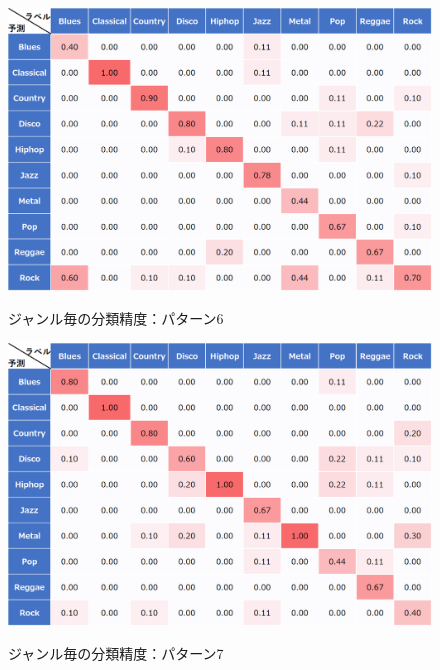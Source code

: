 \begin{figure}[htbp]
	\begin{center}
		\includegraphics[scale=0.5]{./images/classify-model/mel6_matrix.png}
		\caption{ジャンル毎の分類精度：パターン6}
		\label{fig:CNN6}
		\vspace{50pt}
		\includegraphics[scale=0.5]{./images/classify-model/mel7_matrix.png}
		\caption{ジャンル毎の分類精度：パターン7}
		\label{fig:CNN7}
	\end{center}
\end{figure}
\newpage
